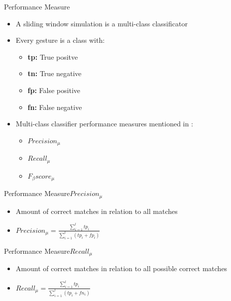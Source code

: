 \begin{frame}{Performance Measure}
    \begin{center}
        \begin{itemize}
            \item A sliding window simulation is a multi-class classificator
            \pause
            \item Every gesture is a class with:
            \pause
            \begin{itemize}
                \item \textbf{tp:} True positve
                \pause
                \item \textbf{tn:} True negative
                \pause
                \item \textbf{fp:} False positive
                \pause
                \item \textbf{fn:} False negative
            \end{itemize}
            \pause
            \item Multi-class classifier performance measures mentioned in \cite{sokolova2009systematic}:
            \pause
            \begin{itemize}
                \item $Precision_{\mu}$
                \pause
                \item $Recall_{\mu}$
                \pause
                \item $F_{\beta}score_{\mu}$
            \end{itemize}
        \end{itemize}
    \end{center}
\end{frame}

\begin{frame}{Performance Measure}{$Precision_{\mu}$}
    \begin{center}
        \begin{itemize}
            \item Amount of correct matches in relation to all matches
            \pause
            \item $Precision_{\mu} = \frac{\sum \limits_{i=1}^{l} tp_i}{\sum \limits_{i=1}^{l} (tp_i + fp_i)}$
        \end{itemize}
    \end{center}
\end{frame}

\begin{frame}{Performance Measure}{$Recall_{\mu}$}
    \begin{center}
        \begin{itemize}
            \item Amount of correct matches in relation to all possible correct matches
            \pause
            \item $Recall_{\mu} = \frac{\sum \limits_{i=1}^{l} tp_i}{\sum \limits_{i=1}^{l} (tp_i + fn_i)}$
        \end{itemize}
    \end{center}
\end{frame}

